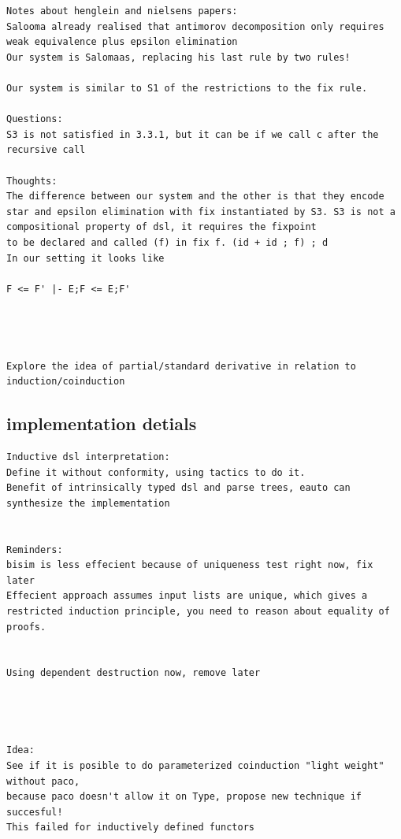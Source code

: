 \documentclass[a4paper,UKenglish,cleveref, autoref, thm-restate]{lipics-v2021}
\begin{document}
\begin{verbatim}
Notes about henglein and nielsens papers:
Salooma already realised that antimorov decomposition only requires weak equivalence plus epsilon elimination
Our system is Salomaas, replacing his last rule by two rules!

Our system is similar to S1 of the restrictions to the fix rule.

Questions:
S3 is not satisfied in 3.3.1, but it can be if we call c after the recursive call

Thoughts:
The difference between our system and the other is that they encode star and epsilon elimination with fix instantiated by S3. S3 is not a compositional property of dsl, it requires the fixpoint 
to be declared and called (f) in fix f. (id + id ; f) ; d
In our setting it looks like

F <= F' |- E;F <= E;F'




Explore the idea of partial/standard derivative in relation to induction/coinduction

\end{verbatim}

\subsection{implementation detials}
\begin{verbatim}
Inductive dsl interpretation:
Define it without conformity, using tactics to do it. 
Benefit of intrinsically typed dsl and parse trees, eauto can synthesize the implementation


Reminders:
bisim is less effecient because of uniqueness test right now, fix later
Effecient approach assumes input lists are unique, which gives a restricted induction principle, you need to reason about equality of proofs.


Using dependent destruction now, remove later 




Idea:
See if it is posible to do parameterized coinduction "light weight" without paco, 
because paco doesn't allow it on Type, propose new technique if succesful!
This failed for inductively defined functors

\end{verbatim}
\end{document}
